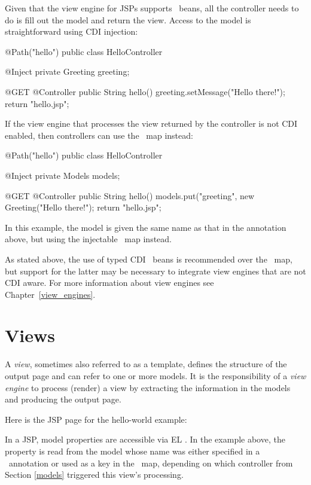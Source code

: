 Given that the view engine for JSPs supports \Named\ beans, all the controller
needs to do is fill out the model and return the view. Access to the model
is straightforward using CDI injection:

\begin{listing}{1}
@Path("hello")
public class HelloController {

	@Inject
	private Greeting greeting;

    @GET
    @Controller
    public String hello() {
        greeting.setMessage("Hello there!");
        return "hello.jsp";
    }
}
\end{listing}

If the view engine that processes the view returned by the controller is not CDI 
enabled, then controllers can use the \Models\ map instead:

\begin{listing}{1}
@Path("hello")
public class HelloController {

	@Inject
	private Models models;

    @GET
    @Controller
    public String hello() {
        models.put("greeting", new Greeting("Hello there!");
        return "hello.jsp";
    }
}
\end{listing}

In this example, the model is given the same name as that in the 
annotation above, but using the injectable \Models\ map instead.

As stated above, the use of typed CDI \Named\ beans is recommended over the \Models\ map,
but support for the latter may be necessary to integrate view engines that are not
CDI aware. For more information about view engines see Chapter~\ref{view_engines}.

\section{Views}
\label{views}

A {\em view}, sometimes also referred to as a template, defines the structure of the output
page and can refer to one or more models. It is the responsibility of a {\em view engine}
to process (render) a view by extracting the information in the models and producing the
output page. 

Here is the JSP page for the hello-world example:


In a JSP, model properties are accessible via EL \cite{el}. In the example above,
the property  is read from the  model whose name
was either specified in a \Named\ annotation or used as a key in the \Models\ map, 
depending on which controller from Section \ref{models} triggered this view's 
processing.

